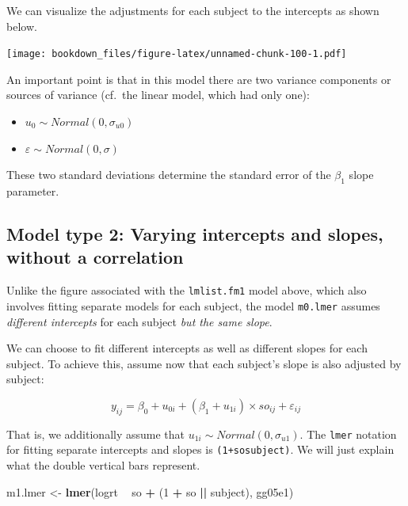 \documentclass[12pt,]{krantz}
\newenvironment{Shaded}{\begin{snugshade}}{\end{snugshade}}
\newcommand{\DecValTok}[1]{\textcolor[rgb]{0.00,0.00,0.81}{#1}}
\newcommand{\KeywordTok}[1]{\textcolor[rgb]{0.13,0.29,0.53}{\textbf{#1}}}
\newcommand{\NormalTok}[1]{#1}
\newcommand{\OperatorTok}[1]{\textcolor[rgb]{0.81,0.36,0.00}{\textbf{#1}}}
\newcommand{\StringTok}[1]{\textcolor[rgb]{0.31,0.60,0.02}{#1}}
\providecommand{\tightlist}{%
  \setlength{\itemsep}{0pt}\setlength{\parskip}{0pt}}
\begin{document}
We can visualize the adjustments for each subject to the intercepts as shown below.

\texttt{[image: bookdown\_files/figure-latex/unnamed-chunk-100-1.pdf]}

An important point is that in this model there are two variance components or sources of variance (cf.~the linear model, which had only one):

\begin{itemize}
\tightlist
\item
  \(u_0 \sim Normal(0,\sigma_{u0})\)
\item
  \(\varepsilon \sim Normal(0,\sigma)\)
\end{itemize}

These two standard deviations determine the standard error of the \(\beta_1\) slope parameter.

\hypertarget{model-type-2-varying-intercepts-and-slopes-without-a-correlation}{%
\subsection{Model type 2: Varying intercepts and slopes, without a correlation}\label{model-type-2-varying-intercepts-and-slopes-without-a-correlation}}

Unlike the figure associated with the \texttt{lmlist.fm1} model above, which also involves fitting separate models for each subject, the model \texttt{m0.lmer} assumes \emph{different intercepts} for each subject \emph{but the same slope}.

We can choose to fit different intercepts as well as different slopes for each subject. To achieve this, assume now that each subject's slope is also adjusted by subject:

\begin{equation}
y_{ij} = \beta_0 + u_{0i}+(\beta_1+u_{1i})\times so_{ij} + \varepsilon_{ij}
\end{equation}

That is, we additionally assume that \(u_{1i} \sim Normal(0,\sigma_{u1})\). The \texttt{lmer} notation for fitting separate intercepts and slopes is \texttt{(1+so\textbar{}\textbar{}subject)}. We will just explain what the double vertical bars represent.

\begin{Shaded}
\begin{Highlighting}[]
\NormalTok{m1.lmer <-}\StringTok{ }\KeywordTok{lmer}\NormalTok{(logrt }\OperatorTok{~}\StringTok{ }\NormalTok{so }\OperatorTok{+}\StringTok{ }\NormalTok{(}\DecValTok{1} \OperatorTok{+}\StringTok{ }\NormalTok{so }\OperatorTok{||}\StringTok{ }\NormalTok{subject), }
\NormalTok{  gg05e1)}
\end{Highlighting}
\end{Shaded}
\end{document}
